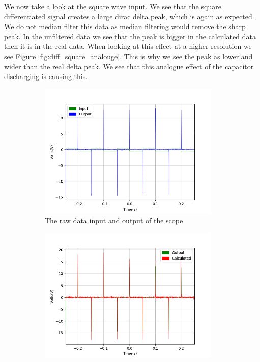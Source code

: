 We now take a look at the square wave input. We see that the square differentiated signal creates a large dirac delta peak, which is again as expected. We do not median filter this data as median filtering would remove the sharp peak. In the unfiltered data we see that the peak is bigger in the calculated data then it is in the real data. When looking at this effect at a higher resolution we see Figure \ref{fig:diff_square_analouge}. This is why we see the peak as lower and wider than the real delta peak. We see that this analogue effect of the capacitor discharging is causing this. \newline

\begin{figure}[h!]
\centering
\begin{subfigure}[t]{.475\textwidth}
  \centering
  \includegraphics[width=0.95\textwidth, height=0.20\textheight]{figures/Differentiation/scope_17raw.png}
  \caption{The raw data input and output of the scope}
 \label{fig:diff_triangular_raw}
\end{subfigure}\hfill
\begin{subfigure}[t]{.475\textwidth}
  \centering
  \includegraphics[width=0.95\textwidth, height=0.20\textheight]{figures/Differentiation/scope_17_calc_front.png}

\end{subfigure}
\end{figure}
